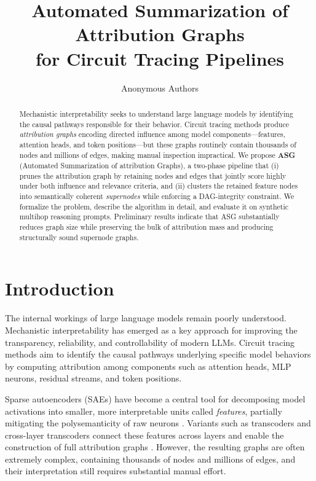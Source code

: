 \documentclass[11pt]{article}
\title{Automated Summarization of Attribution Graphs\\for Circuit Tracing Pipelines}
\author{Anonymous Authors}
\begin{document}
\maketitle

\begin{abstract}
Mechanistic interpretability seeks to understand large language models by identifying the causal pathways responsible for their behavior. Circuit tracing methods produce \emph{attribution graphs} encoding directed influence among model components—features, attention heads, and token positions—but these graphs routinely contain thousands of nodes and millions of edges, making manual inspection impractical. We propose \textbf{ASG} (Automated Summarization of attribution Graphs), a two-phase pipeline that (i) prunes the attribution graph by retaining nodes and edges that jointly score highly under both influence and relevance criteria, and (ii) clusters the retained feature nodes into semantically coherent \emph{supernodes} while enforcing a DAG-integrity constraint. We formalize the problem, describe the algorithm in detail, and evaluate it on synthetic multihop reasoning prompts. Preliminary results indicate that ASG substantially reduces graph size while preserving the bulk of attribution mass and producing structurally sound supernode graphs.
\end{abstract}

\section{Introduction}

The internal workings of large language models remain poorly understood. Mechanistic interpretability has emerged as a key approach for improving the transparency, reliability, and controllability of modern LLMs. Circuit tracing methods aim to identify the causal pathways underlying specific model behaviors by computing attribution among components such as attention heads, MLP neurons, residual streams, and token positions.

Sparse autoencoders (SAEs) have become a central tool for decomposing model activations into smaller, more interpretable units called \emph{features}, partially mitigating the polysemanticity of raw neurons \cite{elhage2022toy}. Variants such as transcoders and cross-layer transcoders connect these features across layers and enable the construction of full attribution graphs \cite{circuit-tracer}. However, the resulting graphs are often extremely complex, containing thousands of nodes and millions of edges, and their interpretation still requires substantial manual effort.
\end{document}
